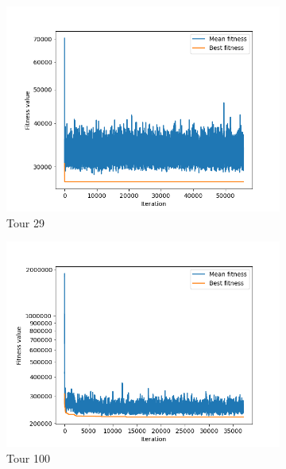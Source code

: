 \documentclass[a4paper,10pt]{article}
\begin{document}
\begin{figure}[H]
    \centering
    \begin{subfigure}[b]{0.40\linewidth}
      \includegraphics[width=\linewidth]{tour_29_28_12_2021_21_10.png}
      \caption[b]{Tour 29}
      \label{fig:tour_29}
    \end{subfigure}
    \begin{subfigure}[b]{0.40\linewidth}
          \includegraphics[width=\linewidth]{tour_100_28_12_2021_20_00.png}
      \caption{Tour 100}
      \label{fig:tour_100}
    \end{subfigure}
    \begin{subfigure}[b]{0.40\linewidth}

\end{subfigure}
\end{figure}
\end{document}

